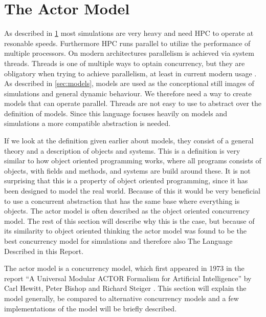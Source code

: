 \section{The Actor Model}
As described in \cref{} most simulations are very heavy and need HPC to operate at resonable speeds. Furthermore HPC runs parallel to utilize the performance of multiple processors. On modern architectures parallelism is achieved via system threads. Threads is one of multiple ways to optain concurrency, but they are obligatory when trying to achieve parallelism, at least in current modern usage . As described in \cref{sec:models}, models are used as the conceptional still images of simulations and general dynamic behaviour. We therefore need a way to create models that can operate parallel. Threads are not easy to use to abstract over the definition of models. Since this language focuses heavily on models and simulations a more compatible abstraction is needed.

If we look at the definition given earlier about models, they consist of a general theory and a description of objects and systems. This is a definition is very similar to how object oriented programming works, where all programs consists of objects, with fields and methods, and systems are build around these. It is not surprising that this is a property of object oriented programming, since it has been designed to model the real world.
Because of this it would be very beneficial to use a concurrent abstraction that has the same base where everything is objects.
The actor model is often described as the object oriented concurrency model. The rest of this section will describe why this is the case, but because of its similarity to object oriented thinking the actor model was found to be the best concurrency model for simulations and therefore also The Language Described in this Report.

The actor model is a concurrency model, which first appeared in 1973 in the report \enquote{A Universal Modular ACTOR Formalism for Artificial Intelligence} by Carl Hewitt, Peter Bishop and Richard Steiger \cite{Hewitt:1973}. This section will explain the model generally, be compared to alternative concurrency models and a few implementations of the model will be briefly described.

